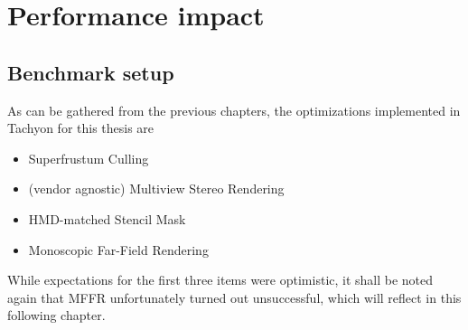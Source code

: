 
\chapter{Performance impact}
\section{Benchmark setup}
As can be gathered from the previous chapters, the optimizations implemented in Tachyon for this thesis are 
\begin{itemize}
\item Superfrustum Culling
\item (vendor agnostic) Multiview Stereo Rendering
\item HMD-matched Stencil Mask
\item Monoscopic Far-Field Rendering
\end{itemize}

While expectations for the first three items were optimistic, it shall be noted again that MFFR unfortunately turned out unsuccessful, which will reflect in this following chapter. 

